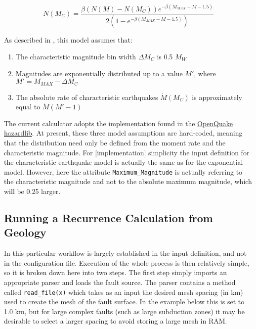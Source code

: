 \begin{equation}
N \left( {M_C} \right) = \frac{\beta \left( {N \left( M \right) - N \left( {M_C} \right)} \right) e^{-\beta \left( {M_{MAX} - M - 1.5} \right)}}{2 \left( {1 - e^{-\beta \left( {M_{MAX} - M - 1.5} \right)}} \right)}
\end{equation}

As described in \cite{YoungsCoppersmith1985}, this model assumes that:
\begin{enumerate}
\item The characteristic magnitude bin width $\Delta M_C$ is 0.5 $M_W$
\item Magnitudes are exponentially distributed up to a value $M'$, where $M' = M_{MAX} - \Delta M_C$
\item The absolute rate of characteristic earthquakes $\dot{M} \left( {M_C} \right)$ is approximately equal to $\dot{M} \left( {M' - 1} \right)$
\end{enumerate}

The current calculator adopts the implementation found in the \href{http://docs.openquake.org/oq-hazardlib/mfd.html#module-openquake.hazardlib.mfd.youngs_coppersmith_1985}{OpenQuake hazardlib}. At present, these three model assumptions are hard-coded, meaning that the distribution need only be defined from the moment rate and the characteristic magnitude. For [implementation] simplicity the input definition for the characteristic earthquake model is actually the same as for the exponential model. However, here the attribute \verb=Maximum_Magnitude= is actually referring to the characteristic magnitude and not to the absolute maximum magnitude, which will be 0.25 larger. 

\subsection{Running a Recurrence Calculation from Geology}

In this particular workflow is largely established in the input definition, and not in the configuration file. Execution of the whole process is then relatively simple, so it is broken down here into two steps. The first step simply imports an appropriate parser and loads the fault source. The parser contains a method called \verb=read_file(x)= which takes as an input the desired mesh spacing (in km) used to create the mesh of the fault surface. In the example below this is set to 1.0 km, but for large complex faults (such as large subduction zones) it may be desirable to select a larger spacing to avoid storing a large mesh in RAM.

